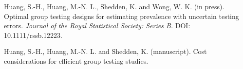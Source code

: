 \documentclass[12pt]{article}
\begin{document}
\begin{description}

\item
Huang, S.-H., Huang, M.-N. L., Shedden, K. and Wong, W. K. (in press).
Optimal group testing designs for estimating prevalence with uncertain testing errors.
\textit{Journal of the Royal Statistical Society: Series B.}
DOI: 10.1111/rssb.12223.

\item
Huang, S.-H., Huang, M.-N. L. and Shedden, K. (manuscript).
Cost considerations for efficient group testing studies.


\end{description}
\end{document}
